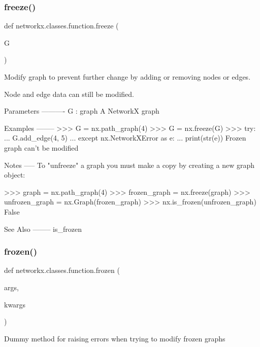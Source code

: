\subsubsection{\texorpdfstring{freeze()}{freeze()}}
{\footnotesize\ttfamily def networkx.\+classes.\+function.\+freeze (\begin{DoxyParamCaption}\item[{}]{G }\end{DoxyParamCaption})}

\begin{DoxyVerb}Modify graph to prevent further change by adding or removing
nodes or edges.

Node and edge data can still be modified.

Parameters
----------
G : graph
  A NetworkX graph

Examples
--------
>>> G = nx.path_graph(4)
>>> G = nx.freeze(G)
>>> try:
...     G.add_edge(4, 5)
... except nx.NetworkXError as e:
...     print(str(e))
Frozen graph can't be modified

Notes
-----
To "unfreeze" a graph you must make a copy by creating a new graph object:

>>> graph = nx.path_graph(4)
>>> frozen_graph = nx.freeze(graph)
>>> unfrozen_graph = nx.Graph(frozen_graph)
>>> nx.is_frozen(unfrozen_graph)
False

See Also
--------
is_frozen
\end{DoxyVerb}
 \mbox{\label{namespacenetworkx_1_1classes_1_1function_ad8cbe4f6fc7d77111cc5a4dff1a9e125}} 
\subsubsection{\texorpdfstring{frozen()}{frozen()}}
{\footnotesize\ttfamily def networkx.\+classes.\+function.\+frozen (\begin{DoxyParamCaption}\item[{}]{args,  }\item[{}]{kwargs }\end{DoxyParamCaption})}

\begin{DoxyVerb}Dummy method for raising errors when trying to modify frozen graphs\end{DoxyVerb}
 \mbox{\label{namespacenetworkx_1_1classes_1_1function_a05c6ec0a398b8dfc9e3545c54134ce37}} 
